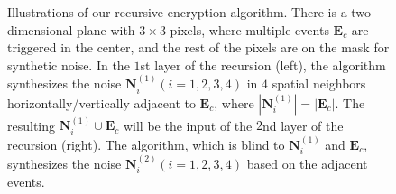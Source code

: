 \documentclass{article}
\begin{document}
\begin{figure}[h]
    \centering
    \qquad
    
    \caption{Illustrations of our recursive encryption algorithm. There is a two-dimensional plane with $3 \times 3$ pixels, where multiple events $\mathbf{E}_c$ are triggered in the center, and the rest of the pixels are on the mask for synthetic noise. In the $1$st layer of the recursion (left), the algorithm synthesizes the noise $\mathbf{N}^{(1)}_i (i=1,2,3,4)$ in $4$ spatial neighbors horizontally/vertically adjacent to $\mathbf{E}_c$, where $|\mathbf{N}^{(1)}_i| = |\mathbf{E}_c|$. The resulting $\mathbf{N}^{(1)}_i \cup \mathbf{E}_c$ will be the input of the $2$nd layer of the recursion (right). The algorithm, which is blind to $\mathbf{N}^{(1)}_i$ and $\mathbf{E}_c$, synthesizes the noise $\mathbf{N}^{(2)}_i (i=1,2,3,4)$ based on the adjacent events.}
\end{figure}
\end{document}
